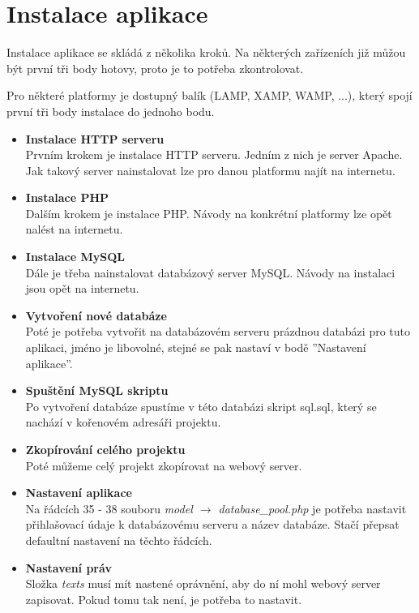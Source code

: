 \documentclass[a4paper]{article}
\begin{document}
	\section{Instalace aplikace}
		Instalace aplikace se skl\'ad\'a z n\v{e}kolika krok\r{u}. Na n\v{e}kter\'ych za\v{r}\'izen\'ich
		ji\v{z} m\r{u}\v{z}ou b\'yt prvn\'i t\v{r}i body hotovy, proto je to pot\v{r}eba zkontrolovat.
		
		Pro n\v{e}kter\'e platformy je dostupn\'y bal\'ik (LAMP, XAMP, WAMP, ...), kter\'y spoj\'i prvn\'i t\v{r}i
		body instalace do jednoho bodu. 
		\begin{itemize}
			\item{\textbf{Instalace HTTP serveru}\\}
				Prvn\'im krokem je instalace HTTP serveru. Jedn\'im z nich je server A\-pa\-che.
				Jak takov\'y server nainstalovat lze pro danou platformu naj\'it na internetu.
			\item{\textbf{Instalace PHP}\\}
				Dal\v{s}\'im krokem je instalace PHP. N\'avody na konkr\'etn\'i platformy lze
				op\v{e}t nal\'est na internetu.
			\item{\textbf{Instalace MySQL}\\}
				D\'ale je t\v{r}eba nainstalovat datab\'azov\'y server MySQL. N\'avody na instalaci
				jsou op\v{e}t na internetu.
			\item{\textbf{Vytvo\v{r}en\'i nov\'e datab\'aze}\\}
				Pot\'e je pot\v{r}eba vytvo\v{r}it na datab\'azov\'em serveru pr\'azdnou datab\'azi
				pro tuto aplikaci, jm\'eno je libovoln\'e, stejn\'e se pak nastav\'i v bod\v{e}
				''Nastaven\'i aplikace''.
			\item{\textbf{Spu\v{s}t\v{e}n\'i MySQL skriptu}\\}
				Po vytvo\v{r}en\'i datab\'aze spust\'ime v t\'eto datab\'azi skript sql.sql, kter\'y
				se nach\'az\'i v ko\v{r}enov\'em adres\'a\v{r}i projektu.
			\item{\textbf{Zkop\'irov\'an\'i cel\'eho projektu}\\}
				Pot\'e m\r{u}\v{z}eme cel\'y projekt zkop\'irovat na webov\'y server.
			\item{\textbf{Nastaven\'i aplikace}\\}
				Na \v{r}\'adc\'ich 35 - 38 souboru \textit{model $\rightarrow$ database\_pool.php}
				je pot\v{r}eba nastavit p\v{r}ihla\v{s}ovac\'i \'udaje k datab\'azov\'emu serveru
				a n\'azev datab\'aze. Sta\v{c}\'i p\v{r}epsat defaultn\'i nastaven\'i na t\v{e}chto
				\v{r}\'adc\'ich.
			\item{\textbf{Nastaven\'i pr\'av}\\}
				Slo\v{z}ka \textit{texts} mus\'i m\'it nasten\'e opr\'avn\v{e}n\'i, aby do n\'i mohl
				webov\'y server zapisovat. Pokud tomu tak nen\'i, je pot\v{r}eba to nastavit.
		\end{itemize}
\end{document}
